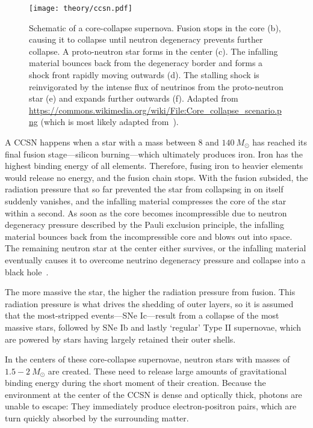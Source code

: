 \begin{figure}[htb]
    \texttt{[image: theory/ccsn.pdf]}
    \caption[Core-collapse supernova]{Schematic of a core-collapse supernova. Fusion stops in the core (b), causing it to collapse until neutron degeneracy prevents further collapse. A proto-neutron star forms in the center (c). The infalling material bounces back from the degeneracy border and forms a shock front rapidly moving outwards (d). The stalling shock is reinvigorated by the intense flux of neutrinos from the proto-neutron star (e) and expands further outwards (f). Adapted from \url{https://commons.wikimedia.org/wiki/File:Core_collapse_scenario.png} (which is most likely adapted from~\cite{Janka2012}).}
\end{figure}

A CCSN happens when a star with a mass between $8$ and $140~M_\odot$ has reached its final fusion stage---silicon burning---which ultimately produces iron. Iron has the highest binding energy of all elements. Therefore, fusing iron to heavier elements would release no energy, and the fusion chain stops. With the fusion subsided, the radiation pressure that so far prevented the star from collapsing in on itself suddenly vanishes, and the infalling material compresses the core of the star within a second. As soon as the core becomes incompressible due to neutron degeneracy pressure described by the Pauli exclusion principle, the infalling material bounces back from the incompressible core and blows out into space. The remaining neutron star at the center either survives, or the infalling material eventually causes it to overcome neutrino degeneracy pressure and collapse into a black hole~\cite{Alsabti2017}.~

The more massive the star, the higher the radiation pressure from fusion. This radiation pressure is what drives the shedding of outer layers, so it is assumed that the most-stripped events---SNe Ic---result from a collapse of the most massive stars, followed by SNe Ib and lastly `regular' Type II supernovae, which are powered by stars having largely retained their outer shells.

In the centers of these core-collapse supernovae, neutron stars with masses of $1.5-2~M_\odot$ are created. These need to release large amounts of gravitational binding energy during the short moment of their creation. Because the environment at the center of the CCSN is dense and optically thick, photons are unable to escape: They immediately produce electron-positron pairs, which are turn quickly absorbed by the surrounding matter.


